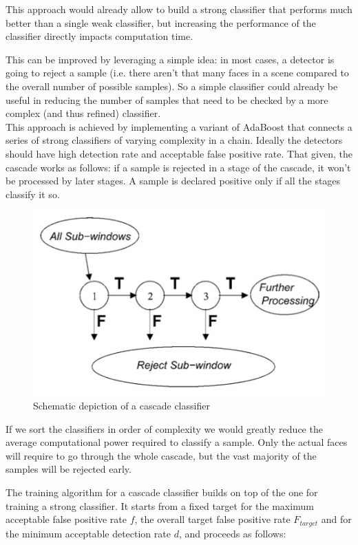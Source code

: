 \documentclass[a4paper,11pt,titlepage]{article}
\begin{document}
This approach would already allow to build a strong classifier that performs
much better than a single weak classifier, but increasing the performance of the
classifier directly impacts computation time.

This can be improved by leveraging a simple idea: in most cases, a detector is
going to reject a sample (i.e. there aren't that many faces in a scene compared
to the overall number of possible samples). So a simple classifier could already
be useful in reducing the number of samples that need to be checked by a more
complex (and thus refined) classifier. \\
This approach is achieved by implementing a variant of AdaBoost \cite{adaboost}
that connects a series of strong classifiers of varying complexity in a chain.
Ideally the detectors should have high detection rate and acceptable false
positive rate. That given, the cascade works as follows: if a sample is rejected
in a stage of the cascade, it won't be processed by later stages. A sample is
declared positive only if all the stages classify it so.

\begin{figure}[h]
  \centering
  \includegraphics[scale=0.5]{cascade_classifier.jpg}
  \caption{Schematic depiction of a cascade classifier}
  \label{fig:cascade_classifier}
\end{figure}

If we sort the classifiers in order of complexity we would greatly reduce the
average computational power required to classify a sample. Only the actual faces
will require to go through the whole cascade, but the vast majority of the
samples will be rejected early.

The training algorithm for a cascade classifier builds on top of the one for
training a strong classifier. It starts from a fixed target for the maximum
acceptable false positive rate $f$, the overall target false positive rate
$F_{target}$ and for the minimum acceptable detection rate $d$, and proceeds as
follows:
\end{document}
